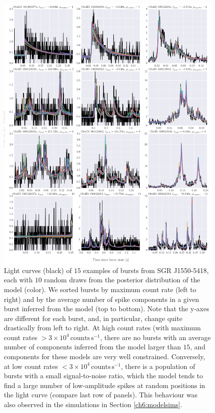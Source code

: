 \documentclass[12pt]{emulateapj}
\begin{document}
\begin{figure}[htbp]
\includegraphics[width=\textwidth]{f5.pdf}%
\caption{Light curves (black) of $15$ examples of bursts from SGR J1550-5418, each with $10$ random draws from the posterior distribution of the model (color). We sorted bursts by maximum count rate 
(left to right) and by the average number of spike components in a given burst inferred from the model (top to bottom). Note that the y-axes are different for each burst, and, in particular, change
quite drastically from left to right. At high count rates 
(with maximum count rates $ > 3\times10^{4}\,\mathrm{counts}\,\mathrm{s}^{-1}$, there are no bursts with an average number of components inferred from the model larger than $15$, and components
 for these models are very well constrained. Conversely, at low count rates $< 3\times10^{4}\,\mathrm{counts}\,\mathrm{s}^{-1}$, there is a population of bursts with a small signal-to-noise ratio, which the 
 model tends to find a large number of low-amplitude spikes at random positions in the light curve (compare last row of panels). This behaviour was also observed in the simulations in Section 
 \ref{ch6:modelsims}.}
\label{fig:lcpanel}
\end{figure}
\end{document}
